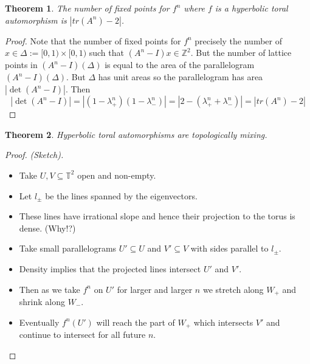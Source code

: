 \documentclass[11pt]{article}
\newcommand{\defeq}{:=}
\newcommand{\abs}[1]{|#1|}
\newcommand{\Z}{\mathbb{Z}}
\newtheorem{theorem}{Theorem}[section]
\begin{document}
\begin{theorem}
The number of fixed points for $f^n$ where $f$ is a hyperbolic toral automorphism is $\abs{tr(A^n)-2}$.
\end{theorem}

\begin{proof}
Note that the number of fixed points for $f^n$ precisely the number of $x\in\Delta\defeq[0, 1) \times [0, 1)$ such that
$(A^n - I)x\in\Z^2$.
But the number of lattice points in $(A^n - I)(\Delta)$ is equal to the area of the parallelogram $(A^n -I)(\Delta)$.
But $\Delta$ has unit areas so the parallelogram has area $\abs{\det(A^n - I)}$.
Then
\[
	\abs{\det(A^n-I)} = \abs{(1-\lambda_+^n)(1-\lambda_-^n)} = \abs{2 - (\lambda_+^n + \lambda_-^n)} = \abs{tr(A^n) - 2}
\]
\end{proof}

\begin{theorem}
Hyperbolic toral automorphisms are topologically mixing.
\end{theorem}

\begin{proof}
\textit{(Sketch).}
\begin{itemize}
	\item Take $U, V\subseteq \mathbb{T}^2$ open and non-empty.
	\item Let $l_\pm$ be the lines spanned by the eigenvectors. 
	\item These lines have irrational slope and hence their projection to the torus is dense. (Why!?)
	\item Take small parallelograms $U'\subseteq U$ and $V'\subseteq V$ with sides parallel to $l_\pm$.
	\item Density implies that the projected lines intersect $U'$ and $V'$.
	\item Then as we take $f^n$ on $U'$ for larger and larger $n$ we stretch along $W_+$ and shrink along $W_-$.
	\item Eventually $f^n(U')$ will reach the part of $W_+$ which intersects $V'$ and continue to intersect for all future $n$.
\end{itemize}
\end{proof}
\end{document}

